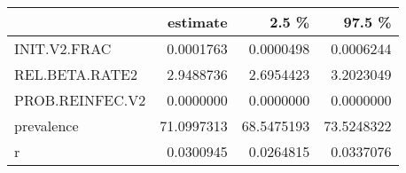 
\begin{tabular}{l|r|r|r}
\hline
  & estimate & 2.5 \% & 97.5 \%\\
\hline
INIT.V2.FRAC & 0.0001763 & 0.0000498 & 0.0006244\\
\hline
REL.BETA.RATE2 & 2.9488736 & 2.6954423 & 3.2023049\\
\hline
PROB.REINFEC.V2 & 0.0000000 & 0.0000000 & 0.0000000\\
\hline
prevalence & 71.0997313 & 68.5475193 & 73.5248322\\
\hline
r & 0.0300945 & 0.0264815 & 0.0337076\\
\hline
\end{tabular}